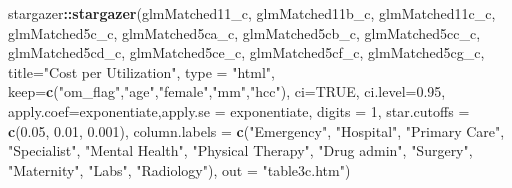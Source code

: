 \documentclass[]{article}
\newenvironment{Shaded}{\begin{snugshade}}{\end{snugshade}}
\newcommand{\KeywordTok}[1]{\textcolor[rgb]{0.13,0.29,0.53}{\textbf{#1}}}
\newcommand{\DataTypeTok}[1]{\textcolor[rgb]{0.13,0.29,0.53}{#1}}
\newcommand{\DecValTok}[1]{\textcolor[rgb]{0.00,0.00,0.81}{#1}}
\newcommand{\FloatTok}[1]{\textcolor[rgb]{0.00,0.00,0.81}{#1}}
\newcommand{\StringTok}[1]{\textcolor[rgb]{0.31,0.60,0.02}{#1}}
\newcommand{\OtherTok}[1]{\textcolor[rgb]{0.56,0.35,0.01}{#1}}
\newcommand{\OperatorTok}[1]{\textcolor[rgb]{0.81,0.36,0.00}{\textbf{#1}}}
\newcommand{\NormalTok}[1]{#1}
\begin{document}
\begin{Shaded}
\begin{Highlighting}[]
\NormalTok{stargazer}\OperatorTok{::}\KeywordTok{stargazer}\NormalTok{(glmMatched11_c, glmMatched11b_c, glmMatched11c_c, glmMatched5c_c, glmMatched5ca_c, glmMatched5cb_c,  glmMatched5cc_c,  glmMatched5cd_c,  glmMatched5ce_c,  glmMatched5cf_c,  glmMatched5cg_c, }
                     \DataTypeTok{title=}\StringTok{"Cost per Utilization"}\NormalTok{, }
                     \DataTypeTok{type =} \StringTok{"html"}\NormalTok{,}
                     \DataTypeTok{keep=}\KeywordTok{c}\NormalTok{(}\StringTok{"om_flag"}\NormalTok{,}\StringTok{"age"}\NormalTok{,}\StringTok{"female"}\NormalTok{,}\StringTok{"mm"}\NormalTok{,}\StringTok{"hcc"}\NormalTok{),}
                     \DataTypeTok{ci=}\OtherTok{TRUE}\NormalTok{, }\DataTypeTok{ci.level=}\FloatTok{0.95}\NormalTok{,}
                     \DataTypeTok{apply.coef=}\NormalTok{exponentiate,}\DataTypeTok{apply.se =}\NormalTok{ exponentiate,}
                     \DataTypeTok{digits =} \DecValTok{1}\NormalTok{, }
                     \DataTypeTok{star.cutoffs =} \KeywordTok{c}\NormalTok{(}\FloatTok{0.05}\NormalTok{, }\FloatTok{0.01}\NormalTok{, }\FloatTok{0.001}\NormalTok{),}
                     \DataTypeTok{column.labels =} \KeywordTok{c}\NormalTok{(}\StringTok{"Emergency"}\NormalTok{, }\StringTok{"Hospital"}\NormalTok{, }\StringTok{"Primary Care"}\NormalTok{, }\StringTok{"Specialist"}\NormalTok{, }\StringTok{"Mental Health"}\NormalTok{, }\StringTok{"Physical Therapy"}\NormalTok{, }\StringTok{"Drug admin"}\NormalTok{, }\StringTok{"Surgery"}\NormalTok{, }\StringTok{"Maternity"}\NormalTok{, }\StringTok{"Labs"}\NormalTok{, }\StringTok{"Radiology"}\NormalTok{),}
                     \DataTypeTok{out =} \StringTok{"table3c.htm"}\NormalTok{)}
\end{Highlighting}
\end{Shaded}
\end{document}
